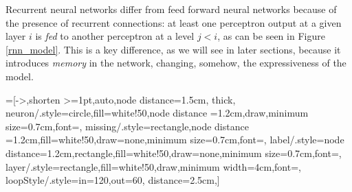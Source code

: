 Recurrent neural networks differ from feed forward neural networks because of the presence of recurrent connections: at least one perceptron output at a given layer $i$ is \textit{fed} to another perceptron
at a level $j<i$, as can be seen in Figure \ref{rnn_model}. 
This is a key difference, as we will see in later sections, because it introduces \textit{memory} in the network, changing, somehow, the expressiveness
of the model.


=[->,shorten >=1pt,auto,node distance=1.5cm,
  thick,
  neuron/.style={circle,fill=white!50,node distance =1.2cm,draw,minimum size=0.7cm,font=\sffamily\Large\bfseries},
  missing/.style={rectangle,node distance =1.2cm,fill=white!50,draw=none,minimum size=0.7cm,font=\sffamily\Huge\bfseries},
  label/.style={node distance=1.2cm,rectangle,fill=white!50,draw=none,minimum size=0.7cm,font=\sffamily\normalsize},
  layer/.style={rectangle,fill=white!50,draw,minimum width=4cm,font=\sffamily\normalsize},
  loopStyle/.style={in=120,out=60, distance=2.5cm},]
